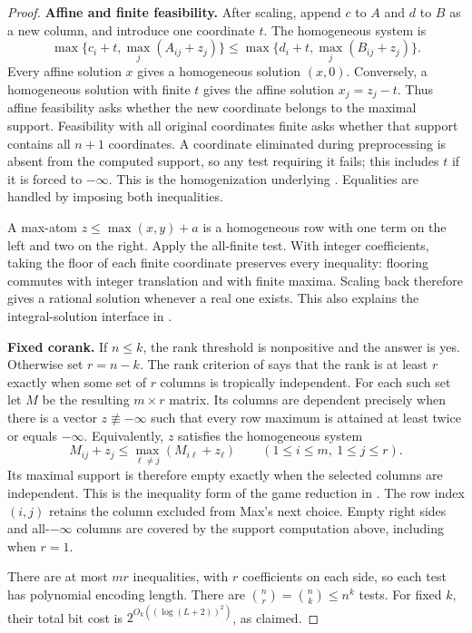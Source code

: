 \begin{proof}
\par\medskip\noindent\textbf{Affine and finite feasibility.}\enspace
After scaling, append $c$ to $A$ and $d$ to $B$ as a new column,
and introduce one coordinate $t$. The homogeneous system is
\[
 \max\bigl\{c_i+t,\max_j(A_{ij}+z_j)\bigr\}
 \leq\max\bigl\{d_i+t,\max_j(B_{ij}+z_j)\bigr\}.
\]
Every affine solution $x$ gives a homogeneous solution $(x,0)$.
Conversely, a homogeneous solution with finite $t$ gives the affine
solution $x_j=z_j-t$. Thus affine feasibility asks whether the new
coordinate belongs to the maximal support. Feasibility with all original
coordinates finite asks whether that support contains all $n+1$
coordinates. A coordinate eliminated during preprocessing is absent
from the computed support, so any test requiring it fails; this includes
$t$ if it is forced to $-\infty$.
This is the homogenization underlying
\cite[Theorem~3.5 and Corollaries~3.4 and~3.7]{AkianGaubertGuterman2012}.
Equalities are handled by imposing both inequalities.

A max-atom $z\leq\max(x,y)+a$ is a homogeneous row with one term on
the left and two on the right. Apply the all-finite test. With integer
coefficients, taking the floor of each finite coordinate preserves every
inequality: flooring commutes with integer translation and with finite
maxima. Scaling back therefore gives a rational solution whenever a real
one exists. This also explains the integral-solution interface in
\cite[Proposition~3.9, Corollary~3.10 and Remark~3.15]
{AkianGaubertGuterman2012}.

\par\medskip\noindent\textbf{Fixed corank.}\enspace
If $n\leq k$, the rank threshold is nonpositive and the answer is yes.
Otherwise set $r=n-k$. The rank criterion of
\cite[Corollaries~4.16--4.17]{AkianGaubertGuterman2012} says that the
rank is at least $r$ exactly when some set of $r$ columns is tropically
independent. For each such set let $M$ be the resulting $m\times r$
matrix. Its columns are dependent precisely when there is a vector
$z\not\equiv-\infty$ such that every row maximum is attained at least
twice or equals $-\infty$. Equivalently, $z$ satisfies the homogeneous
system
\begin{equation}
 M_{ij}+z_j\leq\max_{\ell\ne j}(M_{i\ell}+z_\ell)
 \qquad(1\leq i\leq m,\ 1\leq j\leq r).
 \label{eq:tropical-dependence}
\end{equation}
Its maximal support is therefore empty exactly when the selected columns
are independent. This is the inequality form of the game reduction in
\cite[Theorem~4.9]{AkianGaubertGuterman2012}. The row index $(i,j)$
retains the column excluded from Max's next choice. Empty right sides
and all-$-\infty$ columns are covered by the support computation above,
including when $r=1$.

There are at most $mr$ inequalities, with $r$ coefficients on each
side, so each test has polynomial encoding length. There are
$\binom nr=\binom nk\leq n^k$ tests. For fixed $k$, their total
bit cost is $2^{O_k((\log(L+2))^2)}$, as claimed.
\end{proof}

